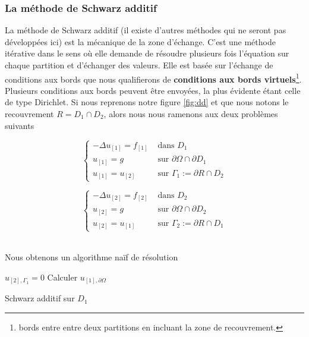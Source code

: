 \documentclass[a4paper,11pt]{article}
\begin{document}
\subsubsection{La méthode de Schwarz additif}
\noindent La méthode de Schwarz additif (il existe d'autres méthodes qui ne seront pas développées ici) est la mécanique de la zone d'échange. C'est une méthode itérative dans le sens où elle demande de résoudre  plusieurs fois l'équation sur chaque partition et d'échanger des valeurs. Elle est basée sur l'échange de conditions aux bords que nous qualifierons de \textbf{conditions aux bords virtuels}\footnote{bords entre entre deux partitions en incluant la zone de recouvrement.}.\\
Plusieurs conditions aux bords peuvent être envoyées, la plus évidente étant celle de type Dirichlet. Si nous reprenons notre figure \ref{fig:dd} et que nous notons le recouvrement $R = D_1 \cap D_2$, alors nous nous ramenons aux deux problèmes suivants\vspace{5mm}\\
\begin{minipage}{0.47\textwidth}
	\begin{equation}
		\begin{cases}
		-\Delta u_{[1]} = f_{[1]}&\text{ dans $D_1$}\\
		u_{[1]} = g & \text{ sur $\partial \Omega \cap \partial D_1$}\\
		u_{[1]} = u_{[2]} &\text{ sur $\Gamma_1 := \partial R \cap D_2$}
		\end{cases}\label{eq:d1}
	\end{equation}
\end{minipage}
\hfill
\begin{minipage}{0.47\textwidth}
	\begin{equation}
	\begin{cases}
	-\Delta u_{[2]} = f_{[2]}&\text{ dans $D_2$}\\
	u_{[2]} = g & \text{ sur $\partial \Omega \cap \partial D_2$}\\
	u_{[2]} = u_{[1]} &\text{ sur $\Gamma_2 := \partial R \cap D_1$}
	\end{cases}
	\end{equation}
\end{minipage}
\vspace{2cm}\\
\noindent Nous obtenons un algorithme naïf de résolution\vspace{3mm}\\
\begin{minipage}{0.47\textwidth}
\begin{algorithm}[H]
		\SetAlgoLined
		$u_{[2], \Gamma_1} = 0$\;
		Calculer $u_{[1], \partial\Omega}$\;
\caption{Schwarz additif sur $D_1$}
\end{algorithm}
\end{minipage}\hfill
\end{document}
